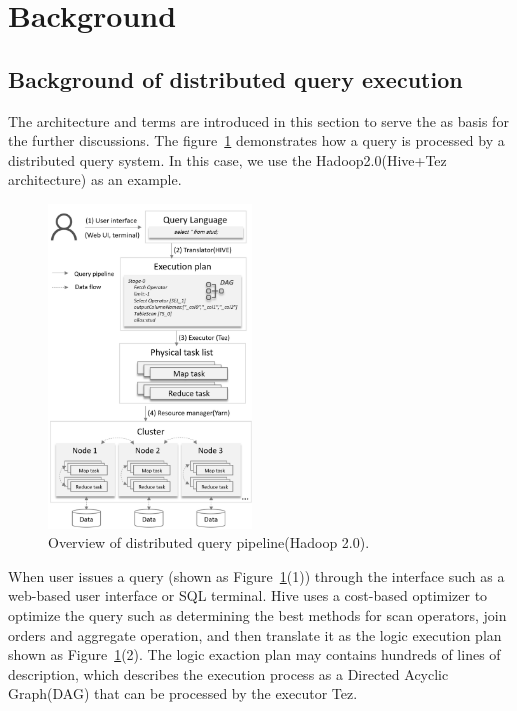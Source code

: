 \section{Background}
\subsection{Background of distributed query execution}
The architecture and terms are introduced in this section to serve the as basis for the further discussions. 
The figure~\ref{fig:architecture} demonstrates how a query is processed by a distributed query system. In this case, we use the Hadoop2.0(Hive+Tez architecture) as an example.

\begin{figure}[t]
	\centering
	\includegraphics[width=0.48\textwidth]{figures/background/arc.png}
	\vspace{-3mm}
	\caption{Overview of distributed query pipeline(Hadoop 2.0).}
	\label{fig:architecture}
	\vspace{-3mm}
\end{figure}



When user issues a query (shown as Figure~\ref{fig:architecture}(1)) through the interface such as a web-based user interface or SQL terminal. 
Hive uses a cost-based optimizer to optimize the query such as determining the best methods for scan operators, join orders and aggregate operation, and then translate it as the logic execution plan shown as Figure~\ref{fig:architecture}(2). The logic exaction plan may contains hundreds of lines of description, which describes the execution process as a Directed Acyclic Graph(DAG) that can be processed by the executor Tez. 


